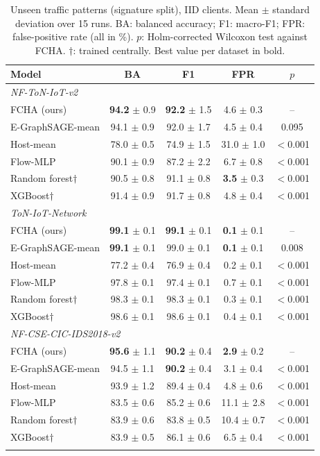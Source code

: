 \documentclass[pdflatex,sn-mathphys-num]{sn-jnl}
\newcommand{\best}[1]{\textbf{#1}}
\begin{document}
\begin{table}[t]
\caption{Unseen traffic patterns (signature split), IID clients. Mean $\pm$ standard deviation over 15 runs. BA: balanced accuracy; F1: macro-F1; FPR: false-positive rate (all in \%). $p$: Holm-corrected Wilcoxon test against FCHA. $\dagger$: trained centrally. Best value per dataset in bold.}\label{tab:signature}
\begin{tabular*}{\textwidth}{@{\extracolsep\fill}lcccc}
\toprule
Model & BA & F1 & FPR & $p$ \\
\midrule
\multicolumn{5}{l}{\emph{NF-ToN-IoT-v2}}\\
FCHA (ours) & \best{94.2} $\pm$ 0.9 & \best{92.2} $\pm$ 1.5 & 4.6 $\pm$ 0.3 & -- \\
E-GraphSAGE-mean & 94.1 $\pm$ 0.9 & 92.0 $\pm$ 1.7 & 4.5 $\pm$ 0.4 & 0.095 \\
Host-mean & 78.0 $\pm$ 0.5 & 74.9 $\pm$ 1.5 & 31.0 $\pm$ 1.0 & $<$0.001 \\
Flow-MLP & 90.1 $\pm$ 0.9 & 87.2 $\pm$ 2.2 & 6.7 $\pm$ 0.8 & $<$0.001 \\
Random forest$\dagger$ & 90.5 $\pm$ 0.8 & 91.1 $\pm$ 0.8 & \best{3.5} $\pm$ 0.3 & $<$0.001 \\
XGBoost$\dagger$ & 91.4 $\pm$ 0.9 & 91.7 $\pm$ 0.8 & 4.8 $\pm$ 0.4 & $<$0.001 \\
\midrule
\multicolumn{5}{l}{\emph{ToN-IoT-Network}}\\
FCHA (ours) & \best{99.1} $\pm$ 0.1 & \best{99.1} $\pm$ 0.1 & \best{0.1} $\pm$ 0.1 & -- \\
E-GraphSAGE-mean & \best{99.1} $\pm$ 0.1 & 99.0 $\pm$ 0.1 & \best{0.1} $\pm$ 0.1 & 0.008 \\
Host-mean & 77.2 $\pm$ 0.4 & 76.9 $\pm$ 0.4 & 0.2 $\pm$ 0.1 & $<$0.001 \\
Flow-MLP & 97.8 $\pm$ 0.1 & 97.4 $\pm$ 0.1 & 0.7 $\pm$ 0.1 & $<$0.001 \\
Random forest$\dagger$ & 98.3 $\pm$ 0.1 & 98.3 $\pm$ 0.1 & 0.3 $\pm$ 0.1 & $<$0.001 \\
XGBoost$\dagger$ & 98.6 $\pm$ 0.1 & 98.6 $\pm$ 0.1 & 0.4 $\pm$ 0.1 & $<$0.001 \\
\midrule
\multicolumn{5}{l}{\emph{NF-CSE-CIC-IDS2018-v2}}\\
FCHA (ours) & \best{95.6} $\pm$ 1.1 & \best{90.2} $\pm$ 0.4 & \best{2.9} $\pm$ 0.2 & -- \\
E-GraphSAGE-mean & 94.5 $\pm$ 1.1 & \best{90.2} $\pm$ 0.4 & 3.1 $\pm$ 0.4 & $<$0.001 \\
Host-mean & 93.9 $\pm$ 1.2 & 89.4 $\pm$ 0.4 & 4.8 $\pm$ 0.6 & $<$0.001 \\
Flow-MLP & 83.5 $\pm$ 0.6 & 85.2 $\pm$ 0.6 & 11.1 $\pm$ 2.8 & $<$0.001 \\
Random forest$\dagger$ & 83.9 $\pm$ 0.6 & 83.8 $\pm$ 0.5 & 10.4 $\pm$ 0.7 & $<$0.001 \\
XGBoost$\dagger$ & 83.9 $\pm$ 0.5 & 86.1 $\pm$ 0.6 & 6.5 $\pm$ 0.4 & $<$0.001 \\
\botrule
\end{tabular*}
\end{table}
\end{document}
